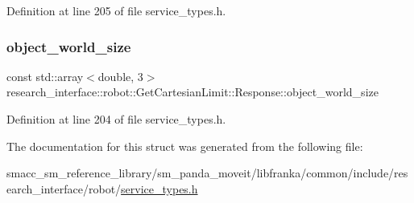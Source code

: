 Definition at line 205 of file service\+\_\+types.\+h.

\mbox{\label{structresearch__interface_1_1robot_1_1GetCartesianLimit_1_1Response_a0f7f582f1128d7945f8be5d7b8135a42}} 
\subsubsection{\texorpdfstring{object\+\_\+world\+\_\+size}{object\_world\_size}}
{\footnotesize\ttfamily const std\+::array$<$double, 3$>$ research\+\_\+interface\+::robot\+::\+Get\+Cartesian\+Limit\+::\+Response\+::object\+\_\+world\+\_\+size}



Definition at line 204 of file service\+\_\+types.\+h.



The documentation for this struct was generated from the following file\+:\begin{DoxyCompactItemize}
\item 
smacc\+\_\+sm\+\_\+reference\+\_\+library/sm\+\_\+panda\+\_\+moveit/libfranka/common/include/research\+\_\+interface/robot/\hyperlink{service__types_8h}{service\+\_\+types.\+h}\end{DoxyCompactItemize}
